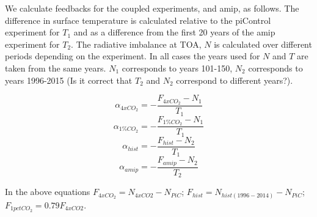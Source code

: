 \documentclass[draft]{agujournal2019}
\begin{document}
We calculate feedbacks for the coupled experiments, and amip, as follows.     The difference in surface temperature is calculated 
relative to the piControl experiment for $T_1$ and as a difference from the first 20 years of the amip experiment for $T_2$.   
The radiative imbalance at TOA, $N$ is calculated over different periods depending on the experiment.  In all cases
the years used for $N$ and $T$ are taken from the same years.  $N_1$ corresponds to years 101-150, $N_2$ corresponds
to years 1996-2015 (Is it correct that $T_2$ and $N_2$ correspond to different years?).     

\begin{equation}
  \alpha_{4xCO_2}=-\frac{F_{4xCO_2}-N_1}{T_1}
\end{equation}
\begin{equation}
  \alpha_{1\%CO_2}=-\frac{F_{1\%CO_2}-N_1}{T_1}
\end{equation}
\begin{equation}
  \alpha_{hist}=-\frac{F_{hist}-N_2}{T_1}
\end{equation}
\begin{equation}
  \alpha_{amip}=-\frac{F_{amip}-N_2}{T_2}
\end{equation}

In the above equations $F_{4xCO_2}=N_{4xCO2}-N_{PiC}$; $F_{hist}=N_{hist(1996-2014)}-N_{PiC}$; 
$F_{1pctCO_2}=0.79F_{4xCO2}$.
\end{document}
